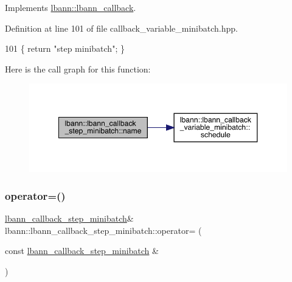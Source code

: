 Implements \hyperlink{classlbann_1_1lbann__callback_a7522c7a14f1d6a1ea762cc2d7248eb3a}{lbann\+::lbann\+\_\+callback}.



Definition at line 101 of file callback\+\_\+variable\+\_\+minibatch.\+hpp.


\begin{DoxyCode}
101 \{ \textcolor{keywordflow}{return} \textcolor{stringliteral}{"step minibatch"}; \}
\end{DoxyCode}
Here is the call graph for this function\+:\nopagebreak
\begin{figure}[H]
\begin{center}
\leavevmode
\includegraphics[width=348pt]{classlbann_1_1lbann__callback__step__minibatch_a2e07fa5a590d68b1b71059d9275ee12a_cgraph}
\end{center}
\end{figure}
\mbox{\label{classlbann_1_1lbann__callback__step__minibatch_adea0e27a38a8094db757a57e4f976769}} 
\subsubsection{\texorpdfstring{operator=()}{operator=()}}
{\footnotesize\ttfamily \hyperlink{classlbann_1_1lbann__callback__step__minibatch}{lbann\+\_\+callback\+\_\+step\+\_\+minibatch}\& lbann\+::lbann\+\_\+callback\+\_\+step\+\_\+minibatch\+::operator= (\begin{DoxyParamCaption}\item[{const \hyperlink{classlbann_1_1lbann__callback__step__minibatch}{lbann\+\_\+callback\+\_\+step\+\_\+minibatch} \&}]{ }\end{DoxyParamCaption})\hspace{0.3cm}{\ttfamily [default]}}

